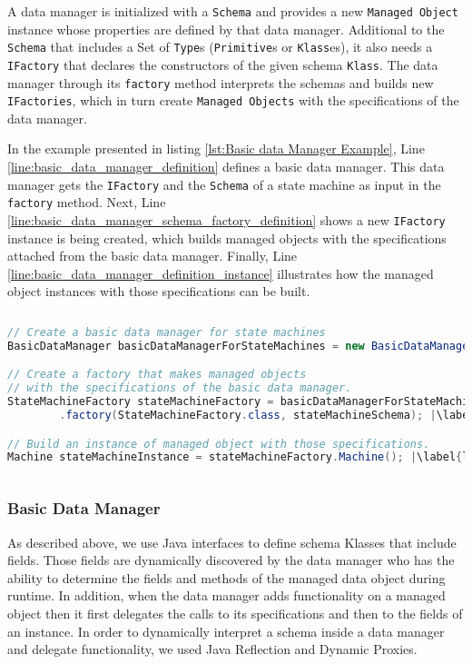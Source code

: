 A data manager is initialized with a \texttt{Schema} and provides a new \texttt{Managed Object} instance whose properties are defined by that data manager.
Additional to the \texttt{Schema} that includes a Set of \texttt{Type}s (\texttt{Primitive}s or \texttt{Klass}es), it also needs a \texttt{IFactory} that declares the constructors of the given schema \texttt{Klass}.
The data manager through its \texttt{factory} method interprets the schemas and builds new \texttt{IFactories}, which in turn create \texttt{Managed Objects} with the specifications of the data manager.

In the example presented in listing \ref{lst:Basic data Manager Example}, Line \ref{line:basic_data_manager_definition} defines a basic data manager.
This data manager gets the \texttt{IFactory} and the \texttt{Schema} of a state machine as input in the \texttt{factory} method. 
Next, Line \ref{line:basic_data_manager_schema_factory_definition} shows a new \texttt{IFactory} instance is being created, which builds managed objects with the specifications attached from the basic data manager.
Finally, Line \ref{line:basic_data_manager_definition_instance} illustrates how the managed object instances with those specifications can be built.

\begin{sourcecode} [H]
	\begin{lstlisting}[language=Java, escapechar=|]
// Create a basic data manager for state machines
BasicDataManager basicDataManagerForStateMachines = new BasicDataManager(); |\label{line:basic_data_manager_definition}|

// Create a factory that makes managed objects 
// with the specifications of the basic data manager.
StateMachineFactory stateMachineFactory = basicDataManagerForStateMachines
		.factory(StateMachineFactory.class, stateMachineSchema); |\label{line:basic_data_manager_schema_factory_definition}|

// Build an instance of managed object with those specifications.
Machine stateMachineInstance = stateMachineFactory.Machine(); |\label{line:basic_data_manager_definition_instance}|
	\end{lstlisting}
	\caption{Basic data Manager Example}
	\label{lst:Basic data Manager Example}
\end{sourcecode}

\subsubsection{Basic Data Manager}
As described above, we use Java interfaces to define schema Klasses that include fields. 
Those fields are dynamically discovered by the data manager who has the ability to determine the fields and methods of the managed data object during runtime.
In addition, when the data manager adds functionality on a managed object then it first delegates the calls to its specifications and then to the fields of an instance.
In order to dynamically interpret a schema inside a data manager and delegate functionality, we used Java Reflection and Dynamic Proxies.

